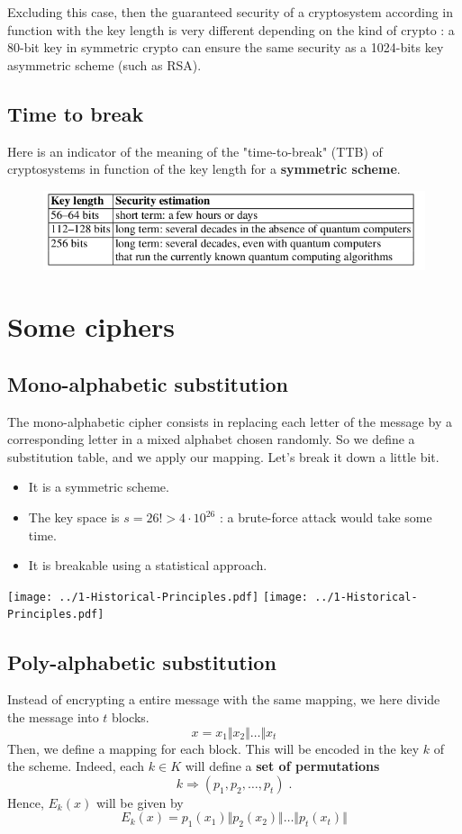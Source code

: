 \documentclass[a4paper, 12pt]{book}
\begin{document}
Excluding this case, then the guaranteed security of a cryptosystem according in function with the key length is very different depending on the kind of crypto : a 80-bit key in symmetric crypto can ensure the same security as a 1024-bits key asymmetric scheme (such as RSA).

\subsection{Time to break}
Here is an indicator of the meaning of the "time-to-break" (TTB) of cryptosystems in function of the key length for a \textbf{symmetric scheme}.
\begin{figure}[h]
    \centering
    \includegraphics[width=0.7\linewidth]{images/1-TTB.png}
\end{figure}
\section{Some ciphers}
\subsection{Mono-alphabetic substitution}
The mono-alphabetic cipher consists in replacing each letter of the message by a corresponding letter in a mixed alphabet chosen randomly. So we define a substitution table, and we apply our mapping. Let's break it down a little bit.
\begin{itemize}
    \item It is a symmetric scheme.
    \item The key space is $s = 26! > 4\cdot 10 ^{26}$ : a brute-force attack would take some time.
    \item It is breakable using a statistical approach.
\end{itemize}
\begin{center}
    \texttt{[image: ../1-Historical-Principles.pdf]}
    \texttt{[image: ../1-Historical-Principles.pdf]}
\end{center}

\subsection{Poly-alphabetic substitution}
Instead of encrypting a entire message with the same mapping, we here divide the message into $t$ blocks.
$$ x = x_1 \Vert x_2 \Vert \dots \Vert x_t$$
Then, we define a mapping for each block. This will be encoded in the key $k$ of the scheme. Indeed, each $k\in K$ will define a \textbf{set of permutations} 
$$k \Rightarrow (p_1, p_2, \dots, p_t) \; .$$
Hence, $E_k(x)$ will be given by 
$$E_k(x) = p_1(x_1) \Vert p_2(x_2) \Vert \dots \Vert p_t(x_t) \Vert $$
\end{document}
